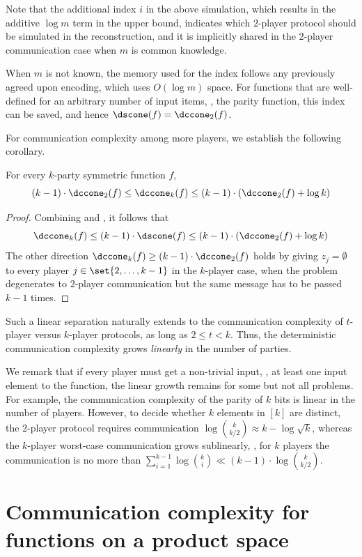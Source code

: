 Note that the additional index $i$ in the above simulation, which results in the additive $\log m$ term in the upper bound, indicates which $2$-player protocol should be simulated in the reconstruction,
and it is implicitly shared in the $2$-player communication case when $m$ is common knowledge.

When $m$ is not known, the memory used for the index follows any previously agreed upon encoding, which uses $O(\log m)$ space.
For functions that are well-defined for an arbitrary number of input items,
\eg, the parity function, this index can be saved, and hence $\dscone(f) = \dccone_2(f)$.

For communication complexity among more players, we establish the following corollary.
\begin{corollary}\label{corollary:dcck-dcc2} 
	For every $k$-party symmetric function $f$,		
	\[ (k-1) \cdot \dccone_2(f) \le \dccone_k(f)  \le  (k-1) \cdot \left(\dccone_2(f) +\log k\right) \]
\end{corollary}
\begin{proof}
	Combining  and , it follows that
	\[\dccone_k(f) \le (k-1) \cdot \dscone(f) \le (k-1) \cdot \left(\dccone_2(f) +\log k\right)\]
	The other direction $\dccone_k(f) \ge (k-1) \cdot \dccone_2(f)$ holds by giving $z_j=\emptyset$ to every player $j\in\set{2,\dots, k-1}$ in the $k$-player case, when the problem degenerates to $2$-player communication but the same message has to be passed $k-1$ times. 
\end{proof}

Such a linear separation naturally extends to the communication complexity of $t$-player versus $k$-player protocols, as long as $2\le t<k$.
Thus, the deterministic communication complexity grows \emph{linearly} in the number of parties.

We remark that if every player must get a non-trivial input, \ie, at least one input element to the function, the linear growth remains for some but not all problems.
For example, the communication complexity of the parity of $k$ bits is linear in the number of players.
However, to decide whether $k$ elements in $[k]$ are distinct, the $2$-player protocol requires communication $\log\binom{k}{k/2}\approx k-\log\sqrt{k}$, whereas the $k$-player worst-case communication grows sublinearly, \ie, for $k$ players the communication is no more than $\sum_{i=1}^{k-1} \log\binom{k}{i} \ll (k-1)\cdot \log \binom{k}{k/2}$.


\section{Communication complexity for functions on a product space}
\label{sec:total}
